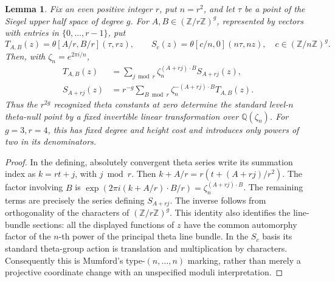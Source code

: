 \documentclass[11pt]{article}
\newtheorem{lemma}[theorem]{Lemma}
\theoremstyle{definition}
\theoremstyle{remark}
\begin{document}
\begin{lemma}\label{lem:theta-fixed-fourier}
Fix an even positive integer \(r\), put \(n=r^2\), and let
\(\tau\) be a point of the Siegel upper half space of degree \(g\).
For \(A,B\in(\mathbb Z/r\mathbb Z)^g\), represented by vectors with
entries in \(\{0,\ldots,r-1\}\), put
\[
 T_{A,B}(z)=\theta[A/r,B/r](\tau,rz),\qquad
 S_c(z)=\theta[c/n,0](n\tau,nz),\quad
 c\in(\mathbb Z/n\mathbb Z)^g.
\]
Then, with \(\zeta_n=e^{2\pi i/n}\),
\begin{align}
 T_{A,B}(z)&=\sum_{j\bmod r}
       \zeta_n^{(A+rj)\cdot B}S_{A+rj}(z),\label{eq:theta-fourier-forward}\\
 S_{A+rj}(z)&=r^{-g}\sum_{B\bmod r}
       \zeta_n^{-(A+rj)\cdot B}T_{A,B}(z).
       \label{eq:theta-fourier-inverse}
\end{align}
Thus the \(r^{2g}\) recognized theta constants at zero determine the
standard level-\(n\) theta-null point by a fixed invertible linear
transformation over \(\mathbb Q(\zeta_n)\). For \(g=3,r=4\), this has
fixed degree and height cost and introduces only powers of two in its
denominators.
\end{lemma}
\begin{proof}
In the defining, absolutely convergent theta series write its summation
index as \(k=rt+j\), with \(j\bmod r\). Then
\(k+A/r=r(t+(A+rj)/r^2)\). The factor involving \(B\) is
\(\exp(2\pi i(k+A/r)\cdot B/r)
 =\zeta_n^{(A+rj)\cdot B}\).
The remaining terms are precisely the series defining \(S_{A+rj}\).
The inverse follows from orthogonality of the characters of
\((\mathbb Z/r\mathbb Z)^g\). This identity also identifies the
line-bundle sections: all the displayed functions of \(z\) have the
common automorphy factor of the \(n\)-th power of the principal theta
line bundle. In the \(S_c\) basis its standard theta-group action is
translation and multiplication by characters. Consequently this is
Mumford's type-\((n,\ldots,n)\) marking, rather than merely a projective
coordinate change with an unspecified moduli interpretation.
\end{proof}
\end{document}
